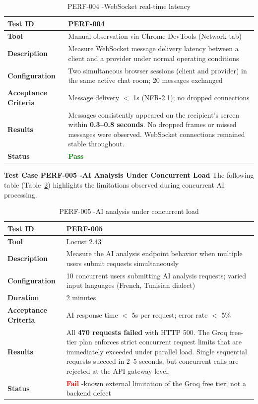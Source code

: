 \begin{table}[H]
\caption{PERF-004 -WebSocket real-time latency}
\centering
\begin{tabular}{|l|p{10cm}|}
\hline
\textbf{Test ID} & PERF-004 \\
\hline
\textbf{Tool} & Manual observation via Chrome DevTools (Network tab) \\
\hline
\textbf{Description} & Measure WebSocket message delivery latency between a client and a provider under normal operating conditions \\
\hline
\textbf{Configuration} & Two simultaneous browser sessions (client and provider) in the same active chat room; 20 messages exchanged \\
\hline
\textbf{Acceptance Criteria} & Message delivery $<$ 1s (NFR-2.1); no dropped connections \\
\hline
\textbf{Results} & Messages consistently appeared on the recipient's screen within \textbf{0.3--0.8 seconds}. No dropped frames or missed messages were observed. WebSocket connections remained stable throughout. \\
\hline
\textbf{Status} & \textcolor{green}{\textbf{Pass}} \\
\hline
\end{tabular}
\label{tab:perf004}
\end{table}

\textbf{Test Case PERF-005 -AI Analysis Under Concurrent Load}
The following table (Table~\ref{tab:perf005}) highlights the limitations observed during concurrent AI processing.


\begin{table}[H]
\caption{PERF-005 -AI analysis under concurrent load}
\centering
\begin{tabular}{|l|p{10cm}|}
\hline
\textbf{Test ID} & PERF-005 \\
\hline
\textbf{Tool} & Locust 2.43 \\
\hline
\textbf{Description} & Measure the AI analysis endpoint behavior when multiple users submit requests simultaneously \\
\hline
\textbf{Configuration} & 10 concurrent users submitting AI analysis requests; varied input languages (French, Tunisian dialect) \\
\hline
\textbf{Duration} & 2 minutes \\
\hline
\textbf{Acceptance Criteria} & AI response time $<$ 5s per request; error rate $<$ 5\% \\
\hline
\textbf{Results} & All \textbf{470 requests failed} with HTTP 500. The Groq free-tier plan enforces strict concurrent request limits that are immediately exceeded under parallel load. Single sequential requests succeed in 2--5 seconds, but concurrent calls are rejected at the API gateway level. \\
\hline
\textbf{Status} & \textcolor{red}{\textbf{Fail}} -known external limitation of the Groq free tier; not a backend defect \\
\hline
\end{tabular}

\label{tab:perf005}
\end{table}

